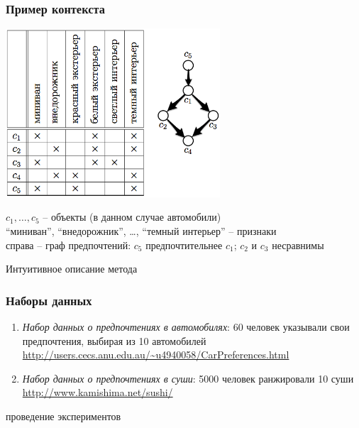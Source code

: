 \documentclass{beamer}
\theoremstyle{definition}
\begin{document}
	\begin{frame}
		\frametitle{Пример контекста}
		\begin{center}
		\includegraphics[width=80mm]{./images/context.png}
		\end{center}
		\vspace{-1.5ex}
		 $c_1, \dotsc, c_5$ – объекты (в данном случае автомобили) \\
		 ``миниван'', ``внедорожник'', \dots, ``темный интерьер'' – признаки \\
		 \vspace{1ex}
		 справа – граф предпочтений: $c_5$ предпочтительнее $c_1$; $c_2$ и $c_3$ несравнимы
	\end{frame}
	
	\begin{frame}
		Интуитивное описание метода 
	\end{frame}
	
	\begin{frame}
		\frametitle{Наборы данных}
		\begin{enumerate}
			\item \emph{Набор данных о предпочтениях в автомобилях}: 60 человек указывали свои предпочтения, выбирая из 10 автомобилей \cite{dataset:Abbasnejad:2013} \\
			\url{http://users.cecs.anu.edu.au/~u4940058/CarPreferences.html}
			\vspace{1em}
			\item \emph{Набор данных о предпочтениях в суши}: 5000 человек ранжировали 10 суши \cite{Kamishima:2003}
			\url{http://www.kamishima.net/sushi/}
		\end{enumerate}
	\end{frame}
	
	\begin{frame}
		проведение экспериментов
	\end{frame}
	
\end{document}
